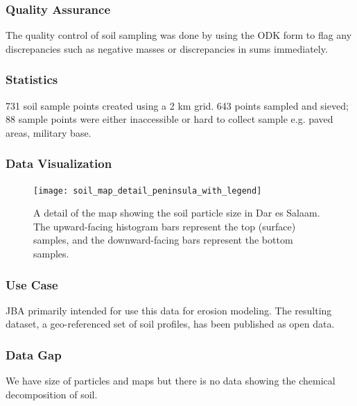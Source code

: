\documentclass[a4paper,12pt,twoside]{article}
\begin{document}
\subsubsection{Quality Assurance}
The quality control of soil sampling was done by  using the ODK form to flag any discrepancies such as negative masses or discrepancies in sums immediately.

\subsubsection{Statistics}
731 soil sample points created using a 2 km grid. 643 points sampled and sieved; 88 sample points were either inaccessible or hard to collect sample e.g. paved areas, military base.

\subsubsection{Data Visualization}
\begin{figure}[h]
  \caption{A detail of the map showing the soil particle size in Dar es Salaam. The upward-facing histogram bars represent the top (surface) samples, and the downward-facing bars represent the bottom samples.}
  \centering
  \texttt{[image: soil\_map\_detail\_peninsula\_with\_legend]}
\end{figure}

\subsubsection{Use Case}
JBA  primarily intended for use this data for erosion modeling. The resulting dataset, a geo-referenced set of soil profiles, has been published as open data.

\subsubsection{Data Gap}
We have size of particles and maps but there is no data showing the chemical decomposition of soil.
\end{document}
